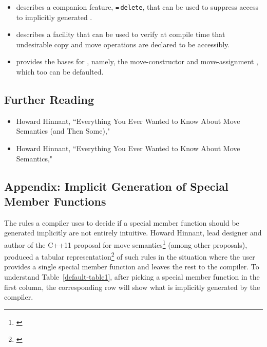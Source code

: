 {\begin{itemize}
\item{describes a companion feature, \lstinline!=!\,\lstinline!delete!, that can be used to suppress access to implicitly generated .}
\item{describes a facility that can be used to verify at compile time that undesirable copy and move operations are declared to be accessibly.}
\item{provides the bases for , namely, the move-constructor and move-assignment , which too can be defaulted.}
\end{itemize}

\subsection[Further Reading]{Further Reading}\label{further-reading}

\begin{itemize}
\item{Howard Hinnant, ``Everything You Ever Wanted to Know About Move Semantics (and Then Some)," \cite{hinnant14}}
\item{Howard Hinnant, ``Everything You Ever Wanted to Know About Move Semantics," \cite{hinnant16}}
\end{itemize}

\subsection[Appendix: Implicit Generation of Special Member Functions]{Appendix: Implicit Generation of Special Member Functions}\label{appendix:-implicit-generation-of-special-member-functions}

The rules a compiler uses to decide if a special member function
should be generated implicitly are not entirely intuitive. Howard
Hinnant, lead designer and author of the C++11 proposal for move
semantics\footnote{\cite{hinnant02}} (among other proposals), produced a tabular representation\footnote{\cite{hinnant16}} of
such rules in the situation where the user provides a single special
member function and leaves the rest to the compiler. To understand Table~\ref{default-table1}, after picking a special member function in the first
column, the corresponding row will show what is implicitly generated by
the compiler. 

}
